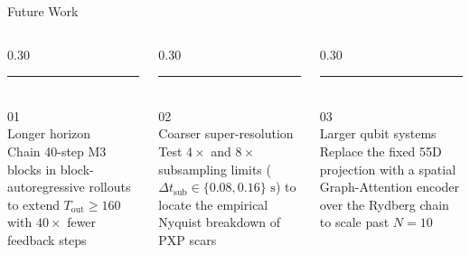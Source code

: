 \documentclass[aspectratio=169,10pt]{beamer}
\begin{document}
\begin{frame}{Future Work}
    \vspace{0.55cm}
    \begin{columns}[T]
        \begin{column}{0.30\textwidth}
            {\color{rulegray}\rule{\linewidth}{0.6pt}}\\[0.32cm]
            {\rmfamily\fontsize{22}{26}\selectfont\color{accentbronze}01}\\[0.28cm]
            {\rmfamily\fontsize{14}{17}\selectfont\color{textdark}Longer horizon}\\[0.14cm]
            {\fontsize{8.8}{12}\selectfont\color{textmuted}Chain 40-step M3 blocks in block-autoregressive rollouts to extend $T_{\text{out}} \ge 160$ with $40\times$ fewer feedback steps}
        \end{column}
        \begin{column}{0.30\textwidth}
            {\color{rulegray}\rule{\linewidth}{0.6pt}}\\[0.32cm]
            {\rmfamily\fontsize{22}{26}\selectfont\color{accentbronze}02}\\[0.28cm]
            {\rmfamily\fontsize{14}{17}\selectfont\color{textdark}Coarser super-resolution}\\[0.14cm]
            {\fontsize{8.8}{12}\selectfont\color{textmuted}Test $4\times$ and $8\times$ subsampling limits ($\Delta t_{\text{sub}} \in \{0.08, 0.16\}\text{ s}$) to locate the empirical Nyquist breakdown of PXP scars}
        \end{column}
        \begin{column}{0.30\textwidth}
            {\color{rulegray}\rule{\linewidth}{0.6pt}}\\[0.32cm]
            {\rmfamily\fontsize{22}{26}\selectfont\color{accentbronze}03}\\[0.28cm]
            {\rmfamily\fontsize{14}{17}\selectfont\color{textdark}Larger qubit systems}\\[0.14cm]
            {\fontsize{8.8}{12}\selectfont\color{textmuted}Replace the fixed 55D projection with a spatial Graph-Attention encoder over the Rydberg chain to scale past $N=10$}
        \end{column}
    \end{columns}
\end{frame}
\end{document}
